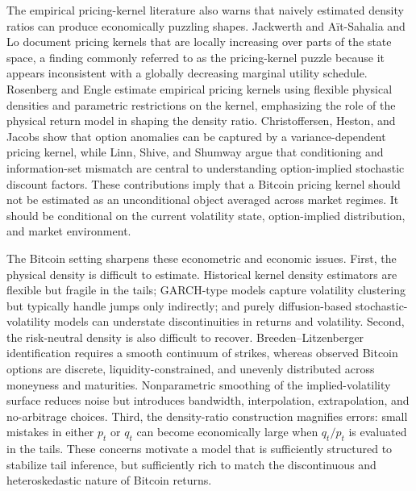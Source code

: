 The empirical pricing-kernel literature also warns that naively estimated density ratios can produce economically puzzling shapes. Jackwerth \citep{Jackwerth2000} and A{\"i}t-Sahalia and Lo \citep{AitSahaliaLo2000} document pricing kernels that are locally increasing over parts of the state space, a finding commonly referred to as the pricing-kernel puzzle because it appears inconsistent with a globally decreasing marginal utility schedule. Rosenberg and Engle \citep{RosenbergEngle2002} estimate empirical pricing kernels using flexible physical densities and parametric restrictions on the kernel, emphasizing the role of the physical return model in shaping the density ratio. Christoffersen, Heston, and Jacobs \citep{ChristoffersenHestonJacobs2013} show that option anomalies can be captured by a variance-dependent pricing kernel, while Linn, Shive, and Shumway \citep{LinnShiveShumway2018} argue that conditioning and information-set mismatch are central to understanding option-implied stochastic discount factors. These contributions imply that a Bitcoin pricing kernel should not be estimated as an unconditional object averaged across market regimes. It should be conditional on the current volatility state, option-implied distribution, and market environment.

The Bitcoin setting sharpens these econometric and economic issues. First, the physical density is difficult to estimate. Historical kernel density estimators are flexible but fragile in the tails; GARCH-type models capture volatility clustering but typically handle jumps only indirectly; and purely diffusion-based stochastic-volatility models can understate discontinuities in returns and volatility. Second, the risk-neutral density is also difficult to recover. Breeden--Litzenberger identification requires a smooth continuum of strikes, whereas observed Bitcoin options are discrete, liquidity-constrained, and unevenly distributed across moneyness and maturities. Nonparametric smoothing of the implied-volatility surface reduces noise but introduces bandwidth, interpolation, extrapolation, and no-arbitrage choices. Third, the density-ratio construction magnifies errors: small mistakes in either $p_t$ or $q_t$ can become economically large when $q_t/p_t$ is evaluated in the tails. These concerns motivate a model that is sufficiently structured to stabilize tail inference, but sufficiently rich to match the discontinuous and heteroskedastic nature of Bitcoin returns.

